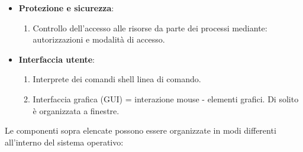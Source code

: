 \documentclass{article}
\begin{document}
\begin{itemize}
    \item \textbf{Protezione e sicurezza}: \begin{enumerate}
        \item Controllo dell'accesso alle risorse da parte dei processi mediante: 
        autorizzazioni e modalità di accesso.
    \end{enumerate}

    \item \textbf{Interfaccia utente}: \begin{enumerate}
        \item Interprete dei comandi shell linea di comando.
        \item Interfaccia grafica (GUI) = interazione mouse - elementi grafici. 
        Di solito è organizzata a finestre.
    \end{enumerate}
\end{itemize}

\medskip
\noindent{}
\medskip

Le componenti sopra elencate possono essere organizzate in modi differenti 
all'interno del sistema operativo:
\end{document}
